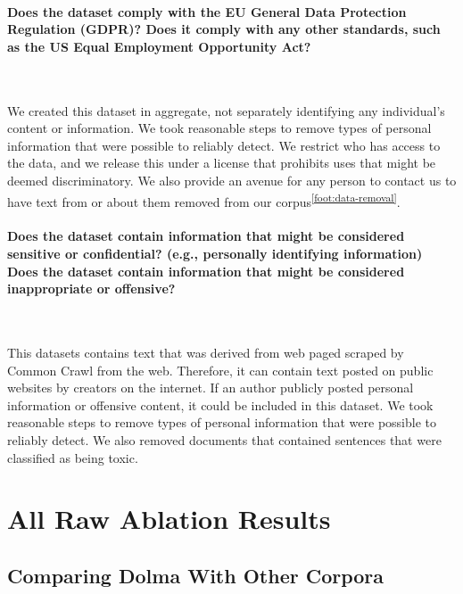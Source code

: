 \documentclass{article}
\newcommand{\dolma}{Dolma\xspace}
\newcommand*{\fnref}[1]{\textsuperscript{\ref{#1}}}
\begin{document}
\paragraph{Does the dataset comply with the EU General Data Protection Regulation (GDPR)? Does it comply with any other standards, such as the US Equal Employment Opportunity Act?}~

We created this dataset in aggregate, not separately identifying any individual’s content or information. 
We took reasonable steps to remove types of personal information that were possible to reliably detect. 
We restrict who has access to the data, and we release this under a license that prohibits uses that might be deemed discriminatory. 
We also provide an avenue for any person to contact us to have text from or about them removed from our corpus\fnref{foot:data-removal}.

\paragraph{Does the dataset contain information that might be considered sensitive or confidential? (e.g., personally identifying information) Does the dataset contain information that might be considered inappropriate or offensive?}~

This datasets contains text that was derived from web paged scraped by Common Crawl from the web. 
Therefore, it can contain text posted on public websites by creators on the internet. 
If an author publicly posted personal information or offensive content, it could be included in this dataset. 
We took reasonable steps to remove types of personal information that were possible to reliably detect. 
We also removed documents that contained sentences that were classified as being toxic. 

\section{All Raw Ablation Results}
\label{app:raw}

\subsection{Comparing \dolma With Other Corpora}
\label{sec:150b_runs}

\label{sec:150b_runs:ppl}
\end{document}
